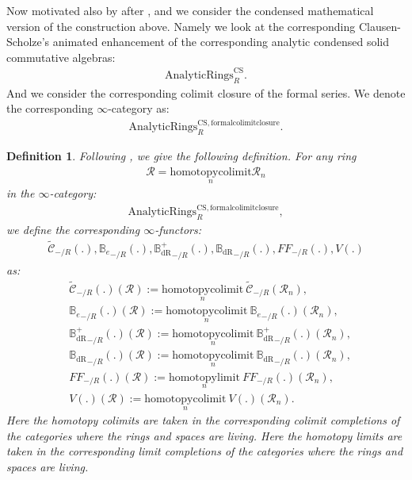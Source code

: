 \documentclass[12pt]{book}
\newtheorem{definition}{Definition}
\begin{document}
\indent Now motivated also by \cite{M} after \cite{CS1}, \cite{CS2} and \cite{CS3} we consider the condensed mathematical version of the construction above. Namely we look at the corresponding Clausen-Scholze's animated enhancement of the corresponding analytic condensed solid commutative algebras:
\begin{align}
\mathrm{AnalyticRings}^\mathrm{CS}_R.	
\end{align}
And we consider the corresponding colimit closure of the formal series. We denote the corresponding $\infty$-category as:
\begin{align}
\mathrm{AnalyticRings}^\mathrm{CS,formalcolimitclosure}_R.	
\end{align}


\begin{definition}
Following \cite[Definition 9.3.3, Definition 9.3.5, Definition 9.3.11, Definition 9.3.9]{KL1}, \cite{KL2} we give the following definition. For any ring
\begin{align}
\mathcal{R}=\underset{n}{\mathrm{homotopycolimit}}\mathcal{R}_n	
\end{align}
in the $\infty$-category:
\begin{align}
\mathrm{AnalyticRings}^\mathrm{CS,formalcolimitclosure}_R,	
\end{align}	
we define the corresponding $\infty$-functors:
\begin{align}
\widetilde{\mathcal{C}}_{-/R}(.),{\mathbb{B}_e}_{-/R}(.),{\mathbb{B}_\mathrm{dR}^+}_{-/R}(.),{\mathbb{B}_\mathrm{dR}}_{-/R}(.),{FF}_{-/R}(.),V(.)	
\end{align}
as:
\begin{align}
&\widetilde{\mathcal{C}}_{-/R}(.)(\mathcal{R}):=\underset{n}{\mathrm{homotopycolimit}}~\widetilde{\mathcal{C}}_{-/R}(\mathcal{R}_n),\\
&{\mathbb{B}_e}_{-/R}(.)(\mathcal{R}):=\underset{n}{\mathrm{homotopycolimit}}~{\mathbb{B}_e}_{-/R}(.)(\mathcal{R}_n),\\
&{\mathbb{B}_\mathrm{dR}^+}_{-/R}(.)(\mathcal{R}):=\underset{n}{\mathrm{homotopycolimit}}~{\mathbb{B}_\mathrm{dR}^+}_{-/R}(.)(\mathcal{R}_n),\\
&{\mathbb{B}_\mathrm{dR}}_{-/R}(.)(\mathcal{R}):=\underset{n}{\mathrm{homotopycolimit}}~{\mathbb{B}_\mathrm{dR}}_{-/R}(.)(\mathcal{R}_n),\\
&{{FF}}_{-/R}(.)(\mathcal{R}):=\underset{n}{\mathrm{homotopylimit}}~{{FF}}_{-/R}(.)(\mathcal{R}_n),\\	
&V(.)(\mathcal{R}):=\underset{n}{\mathrm{homotopycolimit}}~V(.)(\mathcal{R}_n).
\end{align}
Here the homotopy colimits are taken in the corresponding colimit completions of the categories where the rings and spaces are living. Here the homotopy limits are taken in the corresponding limit completions of the categories where the rings and spaces are living.
\end{definition}
\end{document}
